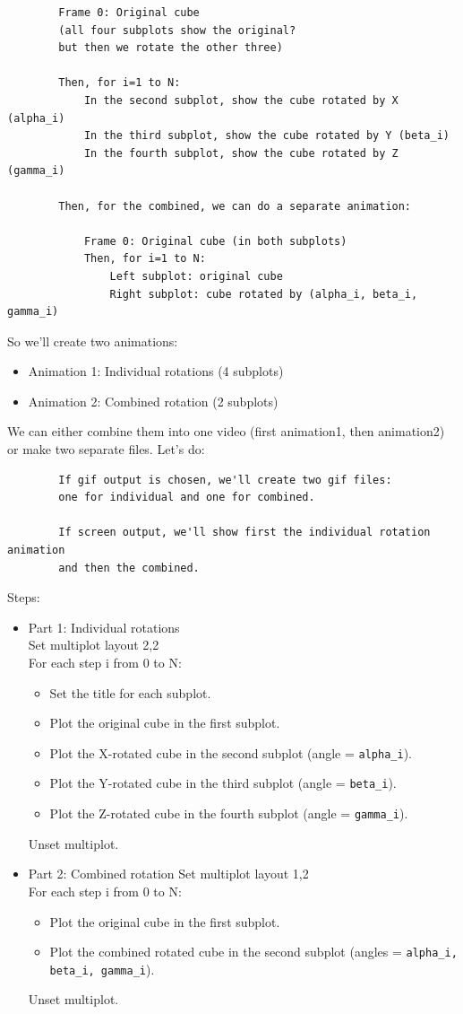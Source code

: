 \documentclass[a4paper,10pt]{article}
\begin{document}
\begin{verbatim}
        Frame 0: Original cube
        (all four subplots show the original?
        but then we rotate the other three)

        Then, for i=1 to N:
            In the second subplot, show the cube rotated by X (alpha_i)
            In the third subplot, show the cube rotated by Y (beta_i)
            In the fourth subplot, show the cube rotated by Z (gamma_i)

        Then, for the combined, we can do a separate animation:

            Frame 0: Original cube (in both subplots)
            Then, for i=1 to N:
                Left subplot: original cube
                Right subplot: cube rotated by (alpha_i, beta_i, gamma_i)
\end{verbatim}
So we'll create two animations:\\
\begin{itemize}
\item Animation 1: Individual rotations (4 subplots)
\item Animation 2: Combined rotation (2 subplots)
\end{itemize}
We can either combine them into one video (first animation1, then animation2) or make two separate files.
Let's do:
\begin{verbatim}
        If gif output is chosen, we'll create two gif files:
        one for individual and one for combined.

        If screen output, we'll show first the individual rotation animation
        and then the combined.
\end{verbatim}
Steps:
\begin{itemize}
\item Part 1: Individual rotations\\
            Set multiplot layout 2,2\\
            For each step i from 0 to N:
\begin{itemize}
       \item    Set the title for each subplot.
       \item    Plot the original cube in the first subplot.
       \item    Plot the X-rotated cube in the second subplot (angle = \verb|alpha_i|).
       \item    Plot the Y-rotated cube in the third subplot (angle = \verb|beta_i|).
       \item    Plot the Z-rotated cube in the fourth subplot (angle = \verb|gamma_i|).
\end{itemize}
            Unset multiplot.
\item Part 2: Combined rotation
            Set multiplot layout 1,2\\
            For each step i from 0 to N:
\begin{itemize}
       \item    Plot the original cube in the first subplot.
       \item    Plot the combined rotated cube in the second subplot (angles = \verb|alpha_i, beta_i, gamma_i|).
\end{itemize}
            Unset multiplot.
\end{itemize}
\end{document}
